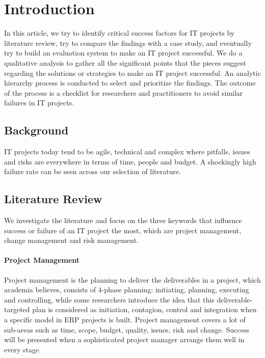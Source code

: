 
\section{Introduction}

In this article, we try to identify critical success factors for IT projects by literature review, try to compare the findings with a case study, and eventually try to build an evaluation system to make an IT project successful. We do a qualitative analysis to gather all the significant points that the pieces suggest regarding the solutions or strategies to make an IT project successful. An analytic hierarchy process is conducted to select and prioritize the findings. The outcome of the process is a checklist for researchers and practitioners to avoid similar failures in IT projects.

\subsection{Background}
IT projects today tend to be agile, technical and complex\parencite[p. 2]{4} where pitfalls, issues and risks are everywhere in terms of time, people and budget. A shockingly high failure rate can be seen across our selection of literature\parencite{2,3}.

\subsection{Literature Review}
We investigate the literature and focus on the three keywords that influence success or failure of an IT project the most, which are project management, change management and risk management.


\paragraph{Project Management}
Project management is the planning to deliver the deliverables in a project, which academia believes, consists of 4-phase planning: initiating, planning, executing and controlling, while some researchers introduce the idea that this deliverable-targeted plan is considered as initiation, contagion, control and integration when a specific model in ERP projects is built\parencite[p. 3]{2}. Project management covers a lot of sub-areas such as time, scope, budget, quality, issues, risk and change. Success will be presented when a sophisticated project manager arrange them well in every stage.

